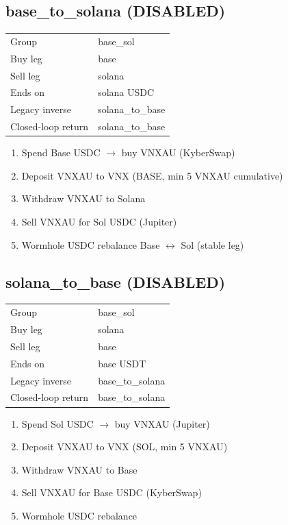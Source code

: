 \documentclass[11pt,a4paper]{article}
\begin{document}
\subsection*{\textcolor{warnred}{base\_to\_solana} (DISABLED)}
\begin{tabular}{@{}ll@{}}
Group & base\_sol \\
Buy leg & base \\
Sell leg & solana \\
Ends on & solana USDC \\
Legacy inverse & solana\_to\_base \\
Closed-loop return & solana\_to\_base \\
\end{tabular}
\begin{enumerate}[nosep,leftmargin=*]
\item Spend Base USDC $\rightarrow$ buy VNXAU (KyberSwap)
\item Deposit VNXAU to VNX (BASE, min 5 VNXAU cumulative)
\item Withdraw VNXAU to Solana
\item Sell VNXAU for Sol USDC (Jupiter)
\item Wormhole USDC rebalance Base $\leftrightarrow$ Sol (stable leg)
\end{enumerate}
\subsection*{\textcolor{warnred}{solana\_to\_base} (DISABLED)}
\begin{tabular}{@{}ll@{}}
Group & base\_sol \\
Buy leg & solana \\
Sell leg & base \\
Ends on & base USDT \\
Legacy inverse & base\_to\_solana \\
Closed-loop return & base\_to\_solana \\
\end{tabular}
\begin{enumerate}[nosep,leftmargin=*]
\item Spend Sol USDC $\rightarrow$ buy VNXAU (Jupiter)
\item Deposit VNXAU to VNX (SOL, min 5 VNXAU)
\item Withdraw VNXAU to Base
\item Sell VNXAU for Base USDC (KyberSwap)
\item Wormhole USDC rebalance
\end{enumerate}
\end{document}
